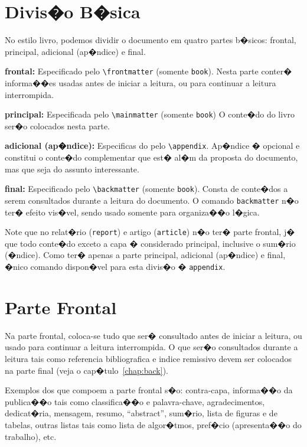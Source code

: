\documentclass[12pt,a4paper,oneside, openany, titlepage]{book}
\begin{document}
\chapter{Divis�o B�sica} \label{chap:basica} %

No estilo livro, podemos dividir o documento em quatro partes b�sicos:
frontal, principal, adicional (ap�ndice) e final.

\textbf{frontal:} Especificado pelo \verb+\frontmatter+ (somente \texttt{book}).
Nesta parte conter� informa��es usadas antes de iniciar a leitura, 
ou para continuar a leitura interrompida.

\textbf{principal:} Especificada pelo \verb+\mainmatter+ (somente \texttt{book})
O conte�do do livro ser�o colocados nesta parte.

\textbf{adicional (ap�ndice):} Especificas do pelo \verb+\appendix+.
Ap�ndice � opcional e constitui o conte�do complementar que est� al�m da
proposta do documento, mas que seja do assunto interessante.

\textbf{final:} Especificado pelo \verb+\backmatter+ (somente \texttt{book}).
Consta de conte�dos a serem consultados durante a leitura do documento.
O comando \verb+backmatter+ n�o ter� efeito vis�vel, sendo usado somente para 
organiza��o l�gica.

Note que no relat�rio (\texttt{report}) e artigo (\texttt{article}) n�o 
ter� parte frontal, j� que todo conte�do exceto a capa � considerado principal, 
inclusive o sum�rio (�ndice). Como ter� apenas a parte principal, adicional 
(ap�ndice) e final, �nico comando dispon�vel para esta divis�o 
� \verb+appendix+.

\chapter{Parte Frontal} \label{chap:front}
Na parte frontal, coloca-se tudo que ser� consultado antes de iniciar a leitura,
ou usado para continuar a leitura interrompida.
O que ser�o consultados durante a leitura tais como referencia bibliografica e 
indice remissivo devem ser colocados na parte final 
(veja o cap�tulo~\ref{chap:back}).

Exemplos dos que compoem a parte frontal s�o:
contra-capa, informa��o da publica��o tais como classifica��o e palavra-chave,
agradecimentos, dedicat�ria, mensagem, resumo, ``abstract'', sum�rio,
lista de figuras e de tabelas, outras listas tais como lista de algor�tmos,
pref�cio (apresenta��o do trabalho), etc.
\end{document}
